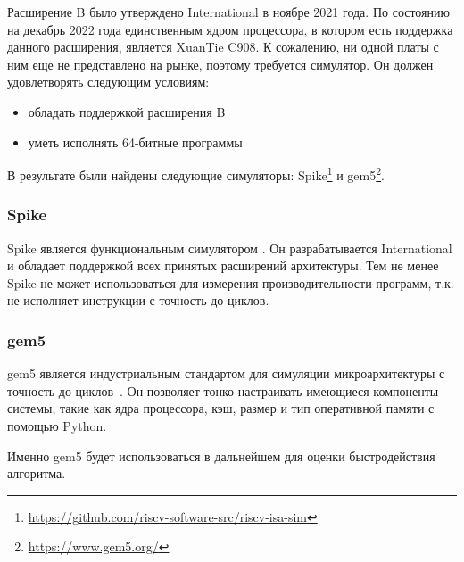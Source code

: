 Расширение B было утверждено \riscv{} \textenglish{International} в ноябре 2021 года.
По состоянию на декабрь 2022 года единственным ядром процессора, в котором есть поддержка данного расширения, является XuanTie C908.
К сожалению, ни одной платы с ним еще не представлено на рынке, поэтому требуется симулятор.
Он должен удовлетворять следующим условиям:
\begin{itemize}
    \item обладать поддержкой расширения B
    \item уметь исполнять 64-битные программы
\end{itemize}
В результате были найдены следующие симуляторы: Spike\footnote{\url{https://github.com/riscv-software-src/riscv-isa-sim}} и gem5\footnote{\url{https://www.gem5.org/}}.

\subsubsection{Spike}
Spike является функциональным симулятором \riscv{}.
Он разрабатывается \riscv{} International и обладает поддержкой всех принятых расширений архитектуры.
Тем не менее Spike не может использоваться для измерения производительности программ, т.к. не исполняет инструкции с точность до циклов. %

\subsubsection{gem5}
gem5 является индустриальным стандартом для симуляции микроархитектуры с точность до циклов~\cite{DBLP:journals/corr/abs-2007-03152}.
Он позволяет тонко настраивать имеющиеся компоненты системы, такие как ядра процессора, кэш,  размер и тип оперативной памяти с помощью Python.

Именно gem5 будет использоваться в дальнейшем для оценки быстродействия алгоритма.